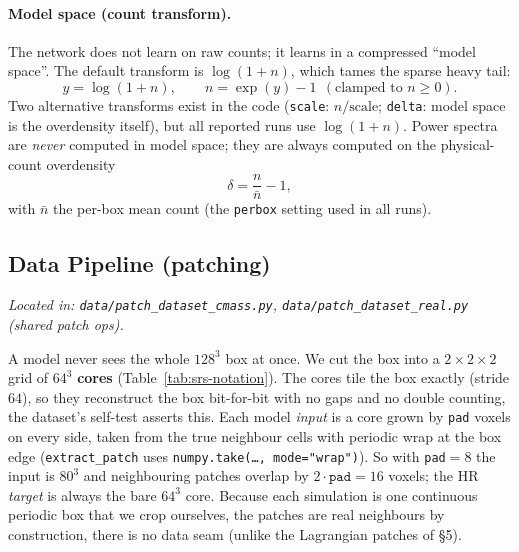 \paragraph{Model space (count transform).} The network does not learn on raw
counts; it learns in a compressed ``model space''. The default transform is
$\log(1+n)$, which tames the sparse heavy tail:
\begin{equation}
  y = \log(1+n), \qquad n = \exp(y)-1 \ \ (\text{clamped to } n\ge 0).
  \label{eq:srs-transform}
\end{equation}
Two alternative transforms exist in the code (\texttt{scale}: $n/\text{scale}$;
\texttt{delta}: model space is the overdensity itself), but all reported runs use
$\log(1+n)$. Power spectra are \emph{never} computed in model space; they are
always computed on the physical-count overdensity 
\begin{equation}
  \delta = \frac{n}{\bar n} - 1,
  \label{eq:srs-delta}
\end{equation}
with $\bar n$ the per-box mean count (the \texttt{perbox} setting used in all
runs).

\subsection{Data Pipeline (patching)}
\textit{Located in: \texttt{data/patch\_dataset\_cmass.py},
\texttt{data/patch\_dataset\_real.py} (shared patch ops).}

A model never sees the whole $128^3$ box at once. We cut the box into a
$2\times2\times2$ grid of $64^3$ \textbf{cores} (Table~\ref{tab:srs-notation}).
The cores tile the box exactly (stride $64$), so they reconstruct the box
bit-for-bit with no gaps and no double counting, the dataset's self-test
asserts this. Each model \emph{input} is a core grown by \texttt{pad} voxels on
every side, taken from the true neighbour cells with periodic wrap at the box
edge (\texttt{extract\_patch} uses \texttt{numpy.take(\dots, mode="wrap")}). So
with \texttt{pad}${=}8$ the input is $80^3$ and neighbouring patches overlap by
$2\cdot\texttt{pad}=16$ voxels; the HR \emph{target} is always the bare $64^3$
core. Because each simulation is one continuous periodic box that we crop
ourselves, the patches are real neighbours by construction, there is no data
seam (unlike the Lagrangian patches of \S5). 

